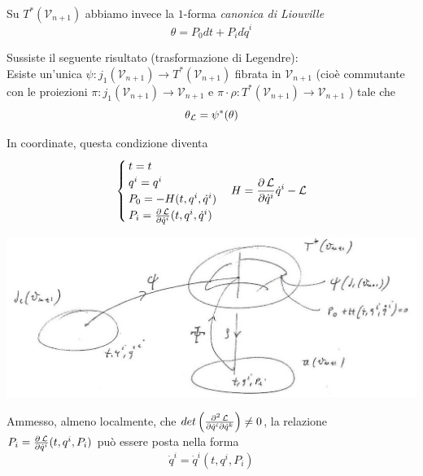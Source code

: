 Su $ T^* (\mathcal{V}_{n+1}) $ abbiamo invece la $ 1 $-forma \textit{canonica di Liouville}
\begin{equation*}
	\theta = P_0 dt + P_i d \dot{q}^i
\end{equation*}

Sussiste il seguente risultato (trasformazione di Legendre): \\
Esiste un'unica $ \psi : j_1 (\mathcal{V}_{n+1}) \longrightarrow T^* (\mathcal{V}_{n+1}) $ fibrata in $ \mathcal{V}_{n+1} $ (cioè commutante con le proiezioni $ \pi :  j_1 (\mathcal{V}_{n+1}) \longrightarrow \mathcal{V}_{n+1} $  e $ \pi \cdot \rho : T^* (\mathcal{V}_{n+1}) \longrightarrow \mathcal{V}_{n+1} $ ) tale che
\begin{equation*}
	\theta_{\operatorname{\mathcal{L}}} = \psi^* (\theta)
\end{equation*}

In coordinate, questa condizione diventa
\begin{equation*}
\begin{cases}
	t = t \\
	q^i = q^i \\
	P_0 = - H (t, q^i, \dot{q}^i) \\
	P_i = \frac{\partial \operatorname{\mathcal{L}}}{\partial \dot{q}^i} (t, q^i, \dot{q}^i)
\end{cases}
	H = \frac{\partial \operatorname{\mathcal{L}}}{\partial \dot{q}^i} \dot{q}^i - \operatorname{\mathcal{L}}
\end{equation*}

\begin{center}
\includegraphics[width=\columnwidth]{media/trasformazione-di-legendre-vista-piu-geometricamente/26-2.jpg}
\end{center}

Ammesso, almeno localmente, che $ det \left( \frac{\partial^2 \operatorname{\mathcal{L}}}{\partial \dot{q}^i \partial \dot{q}^k} \right) \neq 0 $, la relazione $ P_i = \frac{\partial \operatorname{\mathcal{L}}}{\partial \dot{q}^i} (t, q^i, P_i) $ può essere posta nella forma
\begin{equation*}
	\dot{q}^i = \dot{q}^i (t, q^i, P_i)
\end{equation*}

